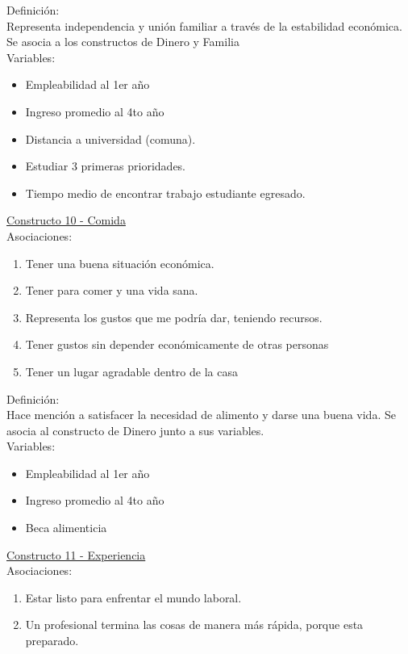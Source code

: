 Definición:\\
Representa independencia y unión familiar a través de la estabilidad económica. Se asocia a los constructos de Dinero y Familia\\

Variables:
\begin{itemize}
	\item Empleabilidad al 1er año
	\item Ingreso promedio al 4to año
	\item Distancia a universidad (comuna).
	\item Estudiar 3 primeras prioridades.
	\item Tiempo medio de encontrar trabajo estudiante egresado.	
\end{itemize} 

\underline {Constructo 10 - Comida} \\
Asociaciones:
\begin{enumerate}
	\item Tener una buena situación económica.
	\item Tener para comer y una vida sana.
	\item Representa los gustos que me podría dar, teniendo recursos.	
	\item Tener gustos sin depender económicamente de otras personas
	\item Tener un lugar agradable dentro de la casa
\end{enumerate}

Definición:\\

Hace mención a satisfacer la necesidad de alimento y darse una buena vida. Se asocia al constructo de Dinero junto a sus variables.\\

Variables:
\begin{itemize}
	\item Empleabilidad al 1er año
	\item Ingreso promedio al 4to año
	\item Beca alimenticia
\end{itemize} 

\underline {Constructo 11 - Experiencia} \\
Asociaciones:
\begin{enumerate}
	\item Estar listo para enfrentar el mundo laboral.
	\item Un profesional termina las cosas de manera más rápida, porque esta preparado.	
\end{enumerate}

